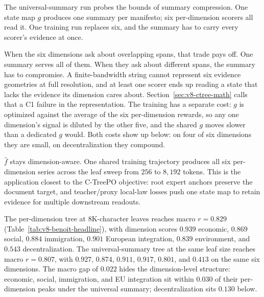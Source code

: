 The universal-summary run probes the bounds of summary compression.
One state map \(g\) produces one summary per manifesto; six
per-dimension scorers all read it. One training run replaces six,
and the summary has to carry every scorer's evidence at once.

When the six dimensions ask about overlapping spans, that trade
pays off. One summary serves all of them. When they ask about
different spans, the summary has to compromise. A finite-bandwidth
string cannot represent six evidence geometries at full resolution,
and at least one scorer ends up reading a state that lacks the
evidence its dimension cares about. Section~\ref{sec:v8-ctree-math}
calls that a C1 failure in the representation. The training has a
separate cost: \(g\) is optimized against the average of the six
per-dimension rewards, so any one dimension's signal is diluted by
the other five, and the shared \(g\) moves slower than a dedicated
\(g\) would. Both costs show up below: on four of six dimensions
they are small, on decentralization they compound.

\(\widehat f\) stays dimension-aware. One shared training
trajectory produces all six per-dimension series across the leaf
sweep from \(256\) to \(8{,}192\) tokens. This is the application
closest to the C-TreePO objective: root expert anchors preserve the
document target, and teacher/proxy local-law losses push one state
map to retain evidence for multiple downstream readouts.

\begin{table}[t]
  \centering
  \resizebox{\linewidth}{!}{}
  \caption{\textbf{Pearson \(r\) against the expert-survey means.}
  Reference rows reproduce the \citet{BenoitEtAl2025} pipeline; C-Tree
  rows use the learned manifesto compression pipeline.}
  \label{tab:v8-benoit-headline}
\end{table}

The per-dimension tree at \(8\)K-character leaves reaches macro
\(r=0.829\) (Table~\ref{tab:v8-benoit-headline}), with dimension
scores \(0.939\) economic, \(0.869\) social, \(0.884\) immigration,
\(0.901\) European integration, \(0.839\) environment, and \(0.543\)
decentralization. The universal-summary tree at the same leaf size
reaches macro \(r=0.807\), with \(0.927\), \(0.874\), \(0.911\),
\(0.917\), \(0.801\), and \(0.413\) on the same six dimensions. The
macro gap of \(0.022\) hides the dimension-level structure: economic,
social, immigration, and EU integration sit within \(0.030\) of their
per-dimension peaks under the universal summary; decentralization
sits \(0.130\) below.

